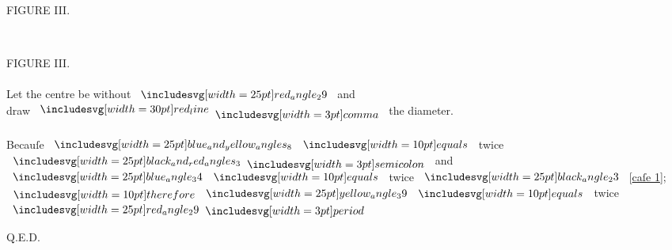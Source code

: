 \documentclass[12pt,preview]{standalone}
\begin{document}
\begin{minipage}[t]{0.33\textwidth}
    \vspace{0pt}
    \begin{center}
        FIGURE III.
    \end{center}
    \hfill\\
    
\end{minipage}
\hfill
\begin{minipage}[t]{0.64\textwidth}
    \vspace{0pt}

    \begin{center}
        FIGURE III.\\
        \hfill\\
        Let the centre be without $\img{red_angle_29}$ and\\
        draw $\redline \bcomma$ the diameter.\\
        \hfill\\
        Becauſe $\img{blue_and_yellow_angles_8} \bequals$ twice $\img{black_and_red_angles_3} \bsemicolon$ and\\
        $\img{blue_angle_34} \bequals$ twice $\img{black_angle_23}$ [\hyperref[book3pr20]{caſe 1}];\\
        $\btherefore \img{yellow_angle_39} \bequals$ twice $\img{red_angle_29} \bperiod$
    \end{center}

    \hfill

    \hfill Q.E.D.
\end{minipage}%
\end{document}
